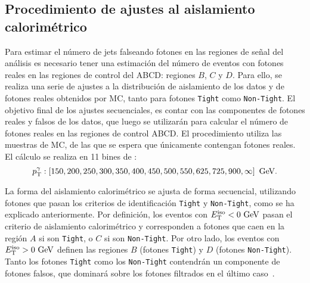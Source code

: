 \subsection{Procedimiento de ajustes al aislamiento calorimétrico}
\label{subsec:bkg:estimation:fits}


Para estimar el número de jets falseando fotones en las regiones de señal del análisis es necesario tener una estimación del número de eventos con fotones reales en las regiones de control del ABCD: regiones \(B\), \(C\) y \(D\). Para ello, se realiza una serie de ajustes a la distribución de aislamiento de los datos y de fotones reales obtenidos por \ac{MC}, tanto para fotones \texttt{Tight} como \texttt{Non-Tight}. El objetivo final de los ajustes secuenciales, es contar con las componentes de fotones reales y falsos de los datos, que luego se utilizarán para calcular el número de fotones reales en las regiones de control ABCD. El procedimiento utiliza las muestras de \ac{MC}, de las que se espera que únicamente contengan fotones reales. El cálculo se realiza en 11 bines de \ptgam:
\begin{equation*}
    p_{\text{T}}^{\gamma}: \left[ 150, 200, 250, 300, 350, 400, 450, 500, 550, 625, 725, 900, \infty \right]~\text{GeV}.
\end{equation*}


La forma del aislamiento calorimétrico \etiso se ajusta de forma secuencial, utilizando fotones que pasan los criterios de identificación \texttt{Tight} y \texttt{Non-Tight}, como se ha explicado anteriormente.
Por definición, los eventos con \(E_{\text{T}}^{\text{iso}}<0~\text{GeV}\) pasan el criterio de aislamiento calorimétrico y corresponden a fotones que caen en la región \(A\) si son \texttt{Tight}, o \(C\) si son \texttt{Non-Tight}. Por otro lado, los eventos con \(E_{\text{T}}^{\text{iso}}>0~\text{GeV}\) definen las regiones \(B\) (fotones \texttt{Tight}) y \(D\) (fotones \texttt{Non-Tight}).
Tanto los fotones \texttt{Tight} como los \texttt{Non-Tight} contendrán un componente de fotones falsos, que dominará sobre los fotones filtrados en el último caso~\cite{ATLAS-DiPhotonSearchIsolation-NOTE,ATLAS-EleMuPhoIsolation-NOTE}.

